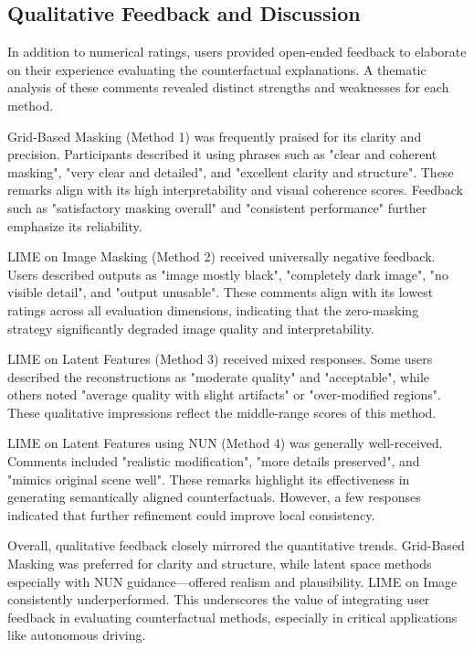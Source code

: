 \vspace{0.5em}
\subsection{Qualitative Feedback and Discussion}

In addition to numerical ratings, users provided open-ended feedback to elaborate on their experience evaluating the counterfactual explanations. A thematic analysis of these comments revealed distinct strengths and weaknesses for each method.

Grid-Based Masking (Method 1) was frequently praised for its clarity and precision. Participants described it using phrases such as "clear and coherent masking", "very clear and detailed", and "excellent clarity and structure". These remarks align with its high interpretability and visual coherence scores. Feedback such as "satisfactory masking overall" and "consistent performance" further emphasize its reliability.

LIME on Image Masking (Method 2) received universally negative feedback. Users described outputs as "image mostly black", "completely dark image", "no visible detail", and "output unusable". These comments align with its lowest ratings across all evaluation dimensions, indicating that the zero-masking strategy significantly degraded image quality and interpretability.

LIME on Latent Features (Method 3) received mixed responses. Some users described the reconstructions as "moderate quality" and "acceptable", while others noted "average quality with slight artifacts" or "over-modified regions". These qualitative impressions reflect the middle-range scores of this method.

LIME on Latent Features using NUN (Method 4) was generally well-received. Comments included "realistic modification", "more details preserved", and "mimics original scene well". These remarks highlight its effectiveness in generating semantically aligned counterfactuals. However, a few responses indicated that further refinement could improve local consistency.

Overall, qualitative feedback closely mirrored the quantitative trends. Grid-Based Masking was preferred for clarity and structure, while latent space methods especially with NUN guidance—offered realism and plausibility. LIME on Image consistently underperformed. This underscores the value of integrating user feedback in evaluating counterfactual methods, especially in critical applications like autonomous driving.